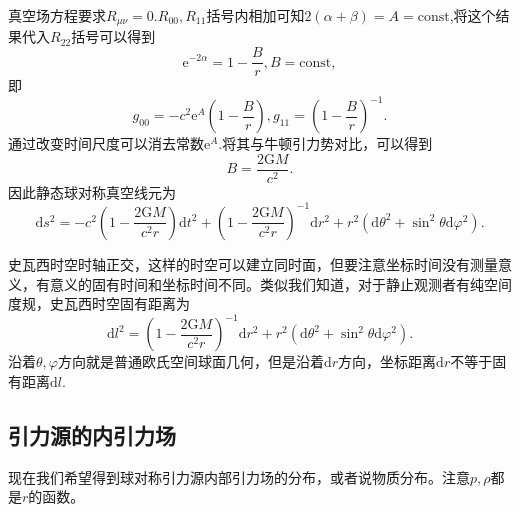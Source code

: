 \documentclass[11pt, a4paper, oneside, onecolumn]{ctexart}
\numberwithin{equation}{subsection}
\begin{document}
真空场方程要求$R_{\mu\nu}=0$.$R_{00},R_{11}$括号内相加可知$2\left(\alpha+\beta\right)=A=\text{const}$,将这个结果代入$R_{22}$括号可以得到
\begin{equation}
\mathrm{e}^{-2\alpha}=1-\frac{B}{r},B=\text{const},
\end{equation}
即
\begin{equation}
g_{00}=-c^{2}\mathrm{e}^{A}\left(1-\frac{B}{r}\right),g_{11}=\left(1-\frac{B}{r}\right)^{-1}.
\end{equation}
通过改变时间尺度可以消去常数$\mathrm{e}^{A}$.将其与牛顿引力势对比，可以得到
\begin{equation}
B=\frac{2\mathrm{G}M}{c^{2}}.
\end{equation}
因此静态球对称真空线元为
\begin{equation}
\mathrm{d}s^{2}=-c^{2}\left(1-\frac{2\mathrm{G}M}{c^{2}r}\right)\mathrm{d}t^{2}+\left(1-\frac{2\mathrm{G}M}{c^{2}r}\right)^{-1}\mathrm{d}r^{2}+r^{2}\left(\mathrm{d}\theta^{2}+\sin^{2}\theta\mathrm{d}\varphi^{2}\right).
\end{equation}

史瓦西时空时轴正交，这样的时空可以建立同时面，但要注意坐标时间没有测量意义，有意义的固有时间和坐标时间不同。类似我们知道，对于静止观测者有纯空间度规，史瓦西时空固有距离为
\begin{equation}
\mathrm{d}l^{2}=\left(1-\frac{2\mathrm{G}M}{c^{2}r}\right)^{-1}\mathrm{d}r^{2}+r^{2}\left(\mathrm{d}\theta^{2}+\sin^{2}\theta\mathrm{d}\varphi^{2}\right).
\end{equation}
沿着$\theta,\varphi$方向就是普通欧氏空间球面几何，但是沿着$\mathrm{d}r$方向，坐标距离$\mathrm{d}r$不等于固有距离$\mathrm{d}l$.

\subsection{引力源的内引力场}
现在我们希望得到球对称引力源内部引力场的分布，或者说物质分布。注意$p,\rho$都是$r$的函数。
\end{document}
